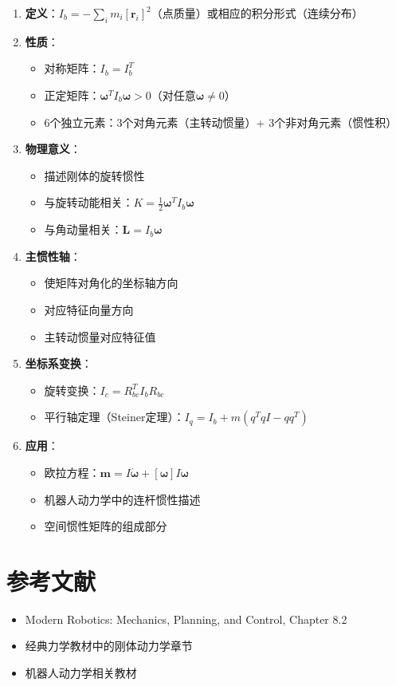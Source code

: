 \documentclass[12pt,a4paper]{article}
\begin{document}
\begin{enumerate}
\item \textbf{定义}：$I_b = -\sum_i m_i [\bm{r}_i]^2$（点质量）或相应的积分形式（连续分布）

\item \textbf{性质}：
\begin{itemize}
\item 对称矩阵：$I_b = I_b^T$
\item 正定矩阵：$\bm{\omega}^T I_b \bm{\omega} > 0$（对任意$\bm{\omega} \neq 0$）
\item 6个独立元素：3个对角元素（主转动惯量）+ 3个非对角元素（惯性积）
\end{itemize}

\item \textbf{物理意义}：
\begin{itemize}
\item 描述刚体的旋转惯性
\item 与旋转动能相关：$K = \frac{1}{2} \bm{\omega}^T I_b \bm{\omega}$
\item 与角动量相关：$\bm{L} = I_b \bm{\omega}$
\end{itemize}

\item \textbf{主惯性轴}：
\begin{itemize}
\item 使矩阵对角化的坐标轴方向
\item 对应特征向量方向
\item 主转动惯量对应特征值
\end{itemize}

\item \textbf{坐标系变换}：
\begin{itemize}
\item 旋转变换：$I_c = R_{bc}^T I_b R_{bc}$
\item 平行轴定理（Steiner定理）：$I_q = I_b + m(q^T q I - q q^T)$
\end{itemize}

\item \textbf{应用}：
\begin{itemize}
\item 欧拉方程：$\bm{m} = I \dot{\bm{\omega}} + [\bm{\omega}] I \bm{\omega}$
\item 机器人动力学中的连杆惯性描述
\item 空间惯性矩阵的组成部分
\end{itemize}
\end{enumerate}

\section{参考文献}

\begin{itemize}
\item Modern Robotics: Mechanics, Planning, and Control, Chapter 8.2
\item 经典力学教材中的刚体动力学章节
\item 机器人动力学相关教材
\end{itemize}
\end{document}
